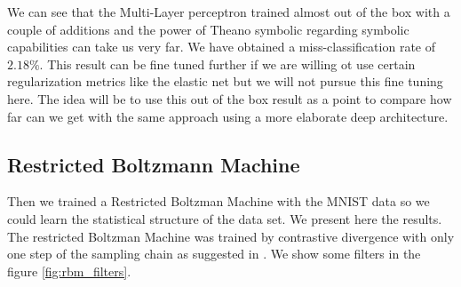 \documentclass[11pt,a4paper]{article}
\begin{document}
We can see that the Multi-Layer perceptron trained almost out of the box with a couple of additions and the power of Theano symbolic regarding symbolic capabilities can take us very far. We have obtained a miss-classification rate of $2.18 \%$.  This result can be fine tuned further if we are willing ot use certain regularization metrics like the elastic net \citep{zou2005regularization} but we will not pursue this fine tuning here. The idea will be to use this out of the box result as a point to compare how far can we get with the same approach using a more elaborate deep architecture. 



\subsection{Restricted Boltzmann Machine}

Then we trained a Restricted Boltzman Machine with the MNIST data so we could learn the statistical structure of the data set. We present here the results. The restricted Boltzman Machine was trained by contrastive divergence with only one step of the sampling chain as suggested in \citep{fischer2014training}. We show some filters in the figure \ref{fig:rbm_filters}.
\end{document}
